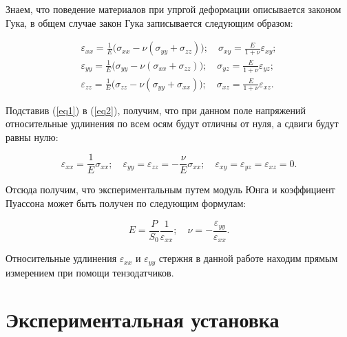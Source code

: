 \documentclass[12pt, a4paper]{article}
\begin{document}
    Знаем, что поведение материалов при упргой деформации описывается законом Гука, в общем случае закон Гука записывается следующим образом:
    
    \begin{equation}
        \begin{aligned}
            \varepsilon_{xx} = \frac{1}{E}\Big(\sigma_{xx} - \nu(\sigma_{yy} + \sigma_{zz})\Big); \quad \sigma_{xy} = \frac{E}{1 + \nu}\varepsilon_{xy};
            \\
            \varepsilon_{yy} = \frac{1}{E}\Big(\sigma_{yy} - \nu(\sigma_{xx} + \sigma_{zz})\Big);\quad  \sigma_{yz} = \frac{E}{1 + \nu}\varepsilon_{yz};
            \\
            \varepsilon_{zz} = \frac{1}{E}\Big(\sigma_{zz} - \nu(\sigma_{yy} + \sigma_{xx})\Big); \quad \sigma_{xz} = \frac{E}{1 + \nu}\varepsilon_{xz}.
        \end{aligned}
        \label{eq2}
    \end{equation}
    
    Подставив (\ref{eq1}) в (\ref{eq2}), получим, что при данном поле напряжений относительные удлинения по всем осям будут отличны от нуля, а сдвиги будут равны нулю:
    
    \begin{equation}
        \varepsilon_{xx} = \frac{1}{E}\sigma_{xx}; \quad \varepsilon_{yy} = \varepsilon_{zz}= - \frac{\nu}{E}\sigma_{xx}; \quad \varepsilon_{xy} = \varepsilon_{yz} = \varepsilon_{xz} = 0.
        \label{eq3}
    \end{equation}
    
    Отсюда получим, что экспериментальным путем модуль Юнга и коэффициент Пуассона может быть получен по следующим формулам:
    
    \begin{equation}
        E = \frac{P}{S_{0}}\frac{1}{\varepsilon_{xx}}; \quad \nu = - \frac{\varepsilon_{yy}}{\varepsilon_{xx}}.
        \label{eq4}
    \end{equation}
    
    Относительные удлинения $\varepsilon_{xx}$ и $\varepsilon_{yy}$ стержня в данной работе находим прямым измерением при помощи тензодатчиков.
    
    \newpage
    
    \section{Экспериментальная установка}
    
\end{document}
